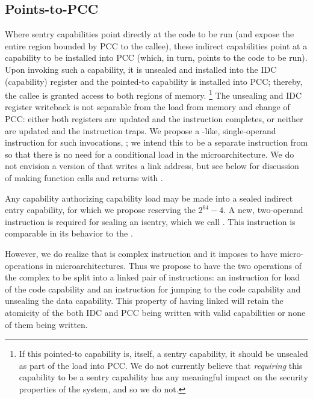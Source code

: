\subsection{Points-to-PCC} %

Where sentry capabilities point directly at the code to be run (and
expose the entire region bounded by PCC to the callee), these indirect
capabilities point at a capability to be installed into PCC (which, in turn,
points to the code to be run).  Upon invoking such a capability, it is unsealed
and installed into the IDC (capability) register and the pointed-to capability
is installed into PCC; thereby, the callee is granted access to both regions of
memory.%
%
\footnote{If this pointed-to capability is, itself, a sentry capability,
it should be unsealed as part of the load into PCC.  We do not currently
believe that \emph{requiring} this capability to be a sentry capability
has any meaningful impact on the security properties of the system, and so we
do not.}
%
The unsealing and IDC register writeback is not separable from the load from
memory and change of PCC: either both registers are updated and the instruction
completes, or neither are updated and the instruction traps.  We propose a
-like, single-operand instruction for such invocations,
; we intend this to be a separate instruction from
 so that there is no need for a conditional load in the
microarchitecture.  We do not envision a version of 
that writes a link address, but see below for discussion of making function
calls and returns with .

Any capability authorizing capability load may be made into a sealed indirect
entry capability, for which we propose reserving the \cotype{} $2^{64} - 4$.%
A new, two-operand instruction is required for sealing an isentry, which we call
. This instruction is comparable in its behavior to the
.

However, we do realize that  is complex instruction and it imposes to have
micro-operations in microarchitectures. Thus we propose to have the two operations
of the complex  to be split into a linked pair of instructions:
an instruction for load of the code capability and an instruction for jumping to the
code capability and unsealing the data capability.
This property of having linked will retain the atomicity of the both IDC and PCC
being written with valid capabilities or none of them being written.

